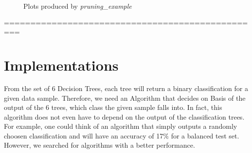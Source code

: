 \documentclass{article}
\begin{document}
\begin{figure}
\centering
{}
\caption{Plots produced by \emph{pruning\_example}}
\label{fig:pruning}
\end{figure}


=================================================
\section{Implementations}
From the set of 6 Decision Trees, each tree will return a binary classification for a given data sample. Therefore, we need an Algorithm that decides on Basis of the output of the 6 trees, which class the given sample falls into. In fact, this algorithm does not even have to depend on the output of the classification trees. For example, one could think of an algorithm that simply outputs a randomly choosen classification and will have an accuracy of 17\% for a balanced test set. However, we searched for algorithms with a better performance.
\end{document}
